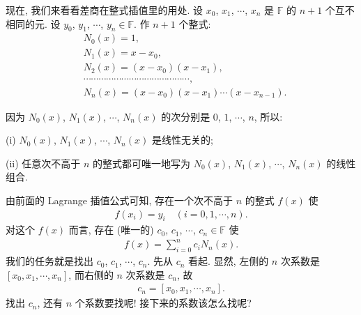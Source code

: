 现在, 我们来看看差商在整式插值里的用处. 设 $x_0$, $x_1$, $\cdots$, $x_{n}$ 是 $\mathbb{F}$ 的 $n+1$ 个互不相同的元. 设 $y_0$, $y_1$, $\cdots$, $y_{n} \in \mathbb{F}$. 作 $n+1$ 个整式:
\begin{align*}
     & N_0 (x) = 1,                                          \\
     & N_1 (x) = x - x_0,                                    \\
     & N_2 (x) = (x - x_0) (x - x_1),                        \\
     & \cdots \cdots \cdots \cdots \cdots \cdots \cdots
    \cdots \cdots \cdots \cdots \cdots \cdots \cdots,        \\
     & N_{n} (x) = (x - x_0) (x - x_1) \cdots (x - x_{n-1}).
\end{align*}

因为 $N_0 (x)$, $N_1 (x)$, $\cdots$, $N_n (x)$ 的次分别是 $0$, $1$, $\cdots$, $n$, 所以:

(i) $N_0 (x)$, $N_1 (x)$, $\cdots$, $N_n (x)$ 是线性无关的;

(ii) 任意次不高于 $n$ 的整式都可唯一地写为 $N_0 (x)$, $N_1 (x)$, $\cdots$, $N_n (x)$ 的线性组合.

由前面的 Lagrange 插值公式可知, 存在一个次不高于 $n$ 的整式 $f(x)$ 使
\begin{align*}
    f(x_i) = y_i \quad (i = 0,1,\cdots,n).
\end{align*}
对这个 $f(x)$ 而言, 存在 (唯一的) $c_0$, $c_1$, $\cdots$, $c_n \in \mathbb{F}$ 使
\begin{align*}
    f(x) = \sum_{i = 0}^{n} c_i N_{n} (x).
\end{align*}
我们的任务就是找出 $c_0$, $c_1$, $\cdots$, $c_n$. 先从 $c_n$ 看起. 显然, 左侧的 $n$ 次系数是 $[x_0, x_1, \cdots, x_n]$, 而右侧的 $n$ 次系数是 $c_n$, 故
\begin{align*}
    c_n = [x_0, x_1, \cdots, x_n].
\end{align*}
找出 $c_n$, 还有 $n$ 个系数要找呢! 接下来的系数该怎么找呢?

